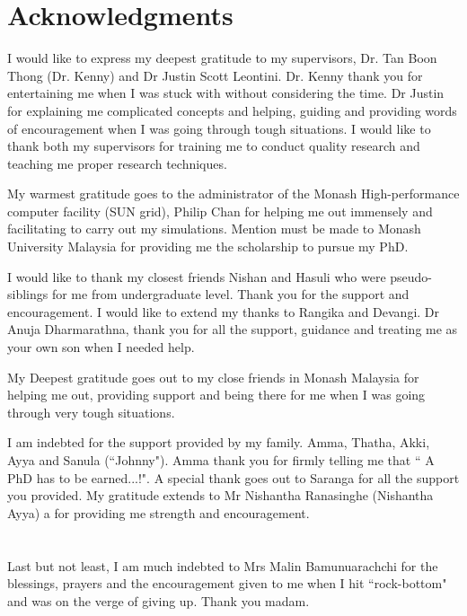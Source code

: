 \chapter*{Acknowledgments}

I would like to express my deepest gratitude to my supervisors, Dr. Tan Boon Thong (Dr. Kenny) and Dr Justin Scott Leontini. Dr. Kenny thank you for entertaining me when I was stuck with without considering the time. Dr Justin for explaining me complicated concepts and helping, guiding and providing words of encouragement when I was going through tough situations. I would like to thank both my supervisors for training me to conduct quality research and teaching me proper research techniques.

My warmest gratitude goes to the administrator of the Monash High-performance computer facility (SUN grid), Philip Chan for helping me out immensely and facilitating to carry out my simulations. Mention must be made to Monash University Malaysia for providing me the scholarship to pursue my PhD. 
 
I would like to thank my closest friends Nishan and Hasuli who were pseudo-siblings for me from undergraduate level. Thank you for the support and encouragement. I would like to extend my thanks to Rangika and Devangi. Dr Anuja Dharmarathna, thank you for all the support, guidance and treating me as your own son when I needed help.

My Deepest gratitude goes out to my close friends in Monash Malaysia for helping me out, providing support and being there for me when I was going through very tough situations. 

I am indebted for the support provided by my family. Amma, Thatha, Akki, Ayya and Sanula (``Johnny"). Amma thank you for firmly telling me that `` A PhD has to be earned...!". A special thank goes out to Saranga for all the support you provided. My gratitude extends to Mr Nishantha Ranasinghe (Nishantha Ayya) a for providing me strength and encouragement.
\\
\\
\\
Last but not least, I am much indebted to Mrs Malin Bamunuarachchi for the blessings, prayers and the encouragement given to me when I hit ``rock-bottom"  and was on the verge of giving up. Thank you madam.    

 

  

  